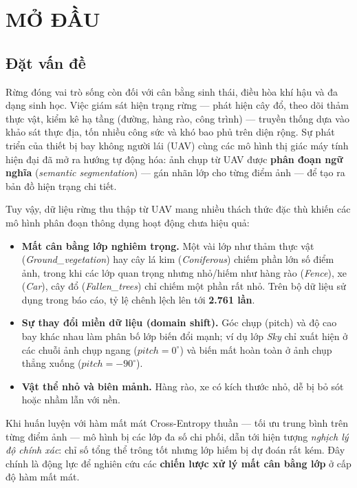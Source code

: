 \chapter{MỞ ĐẦU}
\label{ch:mo_dau}

\section{Đặt vấn đề}

Rừng đóng vai trò sống còn đối với cân bằng sinh thái, điều hòa khí hậu và đa dạng
sinh học. Việc giám sát hiện trạng rừng --- phát hiện cây đổ, theo dõi thảm thực
vật, kiểm kê hạ tầng (đường, hàng rào, công trình) --- truyền thống dựa vào khảo
sát thực địa, tốn nhiều công sức và khó bao phủ trên diện rộng. Sự phát triển của
thiết bị bay không người lái (UAV) cùng các mô hình thị giác máy tính hiện đại đã
mở ra hướng tự động hóa: ảnh chụp từ UAV được \textbf{phân đoạn ngữ nghĩa}
(\textit{semantic segmentation}) --- gán nhãn lớp cho từng điểm ảnh --- để tạo ra
bản đồ hiện trạng chi tiết.

Tuy vậy, dữ liệu rừng thu thập từ UAV mang nhiều thách thức đặc thù khiến các mô
hình phân đoạn thông dụng hoạt động chưa hiệu quả:

\begin{itemize}[leftmargin=1.4cm]
  \item \textbf{Mất cân bằng lớp nghiêm trọng.} Một vài lớp như thảm thực vật
  (\textit{Ground\_vegetation}) hay cây lá kim (\textit{Coniferous}) chiếm phần lớn
  số điểm ảnh, trong khi các lớp quan trọng nhưng nhỏ/hiếm như hàng rào
  (\textit{Fence}), xe (\textit{Car}), cây đổ (\textit{Fallen\_trees}) chỉ chiếm
  một phần rất nhỏ. Trên bộ dữ liệu sử dụng trong báo cáo, tỷ lệ chênh lệch lên tới
  \textbf{2.761 lần}.
  \item \textbf{Sự thay đổi miền dữ liệu (domain shift).} Góc chụp (pitch) và độ
  cao bay khác nhau làm phân bố lớp biến đổi mạnh; ví dụ lớp \textit{Sky} chỉ xuất
  hiện ở các chuỗi ảnh chụp ngang ($pitch = 0^\circ$) và biến mất hoàn toàn ở ảnh
  chụp thẳng xuống ($pitch = -90^\circ$).
  \item \textbf{Vật thể nhỏ và biên mảnh.} Hàng rào, xe có kích thước nhỏ, dễ bị
  bỏ sót hoặc nhầm lẫn với nền.
\end{itemize}

Khi huấn luyện với hàm mất mát Cross-Entropy thuần --- tối ưu trung bình trên từng
điểm ảnh --- mô hình bị các lớp đa số chi phối, dẫn tới hiện tượng
\textit{nghịch lý độ chính xác}: chỉ số tổng thể trông tốt nhưng lớp hiếm bị dự đoán
rất kém. Đây chính là động lực để nghiên cứu các \textbf{chiến lược xử lý mất cân
bằng lớp} ở cấp độ hàm mất mát.

